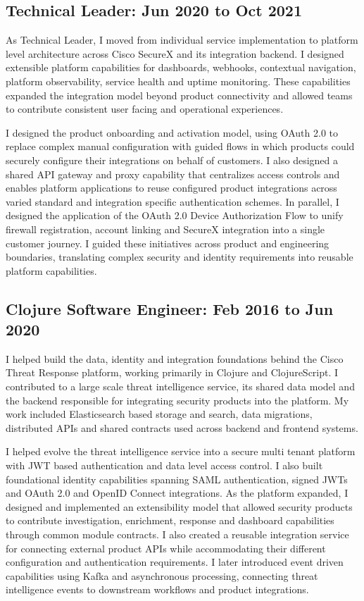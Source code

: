 \documentclass{article}
\begin{document}
\subsection*{Technical Leader: Jun 2020 to Oct 2021}
As Technical Leader, I moved from individual service implementation to platform level architecture across Cisco SecureX and its integration backend. I designed extensible platform capabilities for dashboards, webhooks, contextual navigation, platform observability, service health and uptime monitoring. These capabilities expanded the integration model beyond product connectivity and allowed teams to contribute consistent user facing and operational experiences.

I designed the product onboarding and activation model, using OAuth 2.0 to replace complex manual configuration with guided flows in which products could securely configure their integrations on behalf of customers. I also designed a shared API gateway and proxy capability that centralizes access controls and enables platform applications to reuse configured product integrations across varied standard and integration specific authentication schemes. In parallel, I designed the application of the OAuth 2.0 Device Authorization Flow to unify firewall registration, account linking and SecureX integration into a single customer journey. I guided these initiatives across product and engineering boundaries, translating complex security and identity requirements into reusable platform capabilities.

\subsection*{Clojure Software Engineer: Feb 2016 to Jun 2020}
I helped build the data, identity and integration foundations behind the Cisco Threat Response platform, working primarily in Clojure and ClojureScript. I contributed to a large scale threat intelligence service, its shared data model and the backend responsible for integrating security products into the platform. My work included Elasticsearch based storage and search, data migrations, distributed APIs and shared contracts used across backend and frontend systems.

I helped evolve the threat intelligence service into a secure multi tenant platform with JWT based authentication and data level access control. I also built foundational identity capabilities spanning SAML authentication, signed JWTs and OAuth 2.0 and OpenID Connect integrations. As the platform expanded, I designed and implemented an extensibility model that allowed security products to contribute investigation, enrichment, response and dashboard capabilities through common module contracts. I also created a reusable integration service for connecting external product APIs while accommodating their different configuration and authentication requirements. I later introduced event driven capabilities using Kafka and asynchronous processing, connecting threat intelligence events to downstream workflows and product integrations.
\end{document}
